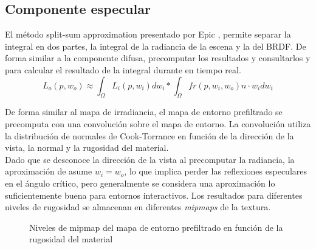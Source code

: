 
        \subsection{Componente especular}
        El m\'etodo split-sum approximation presentado por Epic \autocite{unreal}, permite separar la integral en dos partes, la integral de
        la radiancia de la escena y la del BRDF. De forma similar a la componente difusa, precomputar los resultados y consultarlos y para
        calcular el resultado de la integral durante en tiempo real.\\
        
        \singlespacing
        \begin{equation}
            L_o(p, w_o) \approx
            \int_{\Omega}L_i(p, w_i)dw_i * \int_{\Omega}fr(p, w_i, w_o) n\cdot{w_i}dw_i
        \end{equation}
        \singlespacing

        De forma similar al mapa de irradiancia, el mapa de entorno prefiltrado se precomputa con una convoluci\'on sobre el mapa
        de entorno. La convoluci\'on utiliza la distribuci\'on de normales de Cook-Torrance \autocite{cooktorrance} en funci\'on
        de la direcci\'on de la vista, la normal y la rugosidad del material.\\

        Dado que se desconoce la direcci\'on de la vista al precomputar la radiancia, la aproximaci\'on de asume $w_i = w_o$, lo que implica perder las
        reflexiones especulares en el \'angulo cr\'itico, pero generalmente se considera una aproximaci\'on lo suficientemente buena para entornos
        interactivos. Los resultados para diferentes niveles de rugosidad se almacenan en diferentes \textit{mipmaps} de la textura.\\

        
        \begin{figure}[H]
            \vspace{0.5cm}
            \centering
            \caption{Niveles de mipmap del mapa de entorno prefiltrado en funci\'on de la rugosidad del material}
        \end{figure}
        \singlespacing

